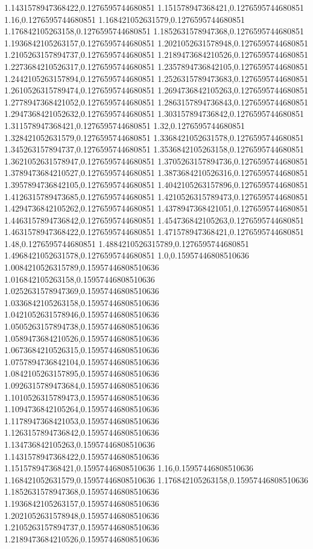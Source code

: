 1.1431578947368422,0.1276595744680851
1.151578947368421,0.1276595744680851
1.16,0.1276595744680851
1.168421052631579,0.1276595744680851
1.176842105263158,0.1276595744680851
1.1852631578947368,0.1276595744680851
1.1936842105263157,0.1276595744680851
1.2021052631578948,0.1276595744680851
1.2105263157894737,0.1276595744680851
1.2189473684210526,0.1276595744680851
1.2273684210526317,0.1276595744680851
1.2357894736842105,0.1276595744680851
1.2442105263157894,0.1276595744680851
1.2526315789473683,0.1276595744680851
1.2610526315789474,0.1276595744680851
1.2694736842105263,0.1276595744680851
1.2778947368421052,0.1276595744680851
1.2863157894736843,0.1276595744680851
1.2947368421052632,0.1276595744680851
1.303157894736842,0.1276595744680851
1.311578947368421,0.1276595744680851
1.32,0.1276595744680851
1.328421052631579,0.1276595744680851
1.3368421052631578,0.1276595744680851
1.345263157894737,0.1276595744680851
1.3536842105263158,0.1276595744680851
1.3621052631578947,0.1276595744680851
1.3705263157894736,0.1276595744680851
1.3789473684210527,0.1276595744680851
1.3873684210526316,0.1276595744680851
1.3957894736842105,0.1276595744680851
1.4042105263157896,0.1276595744680851
1.4126315789473685,0.1276595744680851
1.4210526315789473,0.1276595744680851
1.4294736842105262,0.1276595744680851
1.4378947368421051,0.1276595744680851
1.4463157894736842,0.1276595744680851
1.454736842105263,0.1276595744680851
1.4631578947368422,0.1276595744680851
1.471578947368421,0.1276595744680851
1.48,0.1276595744680851
1.4884210526315789,0.1276595744680851
1.4968421052631578,0.1276595744680851
1.0,0.15957446808510636
1.0084210526315789,0.15957446808510636
1.016842105263158,0.15957446808510636
1.0252631578947369,0.15957446808510636
1.0336842105263158,0.15957446808510636
1.0421052631578946,0.15957446808510636
1.0505263157894738,0.15957446808510636
1.0589473684210526,0.15957446808510636
1.0673684210526315,0.15957446808510636
1.0757894736842104,0.15957446808510636
1.0842105263157895,0.15957446808510636
1.0926315789473684,0.15957446808510636
1.1010526315789473,0.15957446808510636
1.1094736842105264,0.15957446808510636
1.1178947368421053,0.15957446808510636
1.1263157894736842,0.15957446808510636
1.134736842105263,0.15957446808510636
1.1431578947368422,0.15957446808510636
1.151578947368421,0.15957446808510636
1.16,0.15957446808510636
1.168421052631579,0.15957446808510636
1.176842105263158,0.15957446808510636
1.1852631578947368,0.15957446808510636
1.1936842105263157,0.15957446808510636
1.2021052631578948,0.15957446808510636
1.2105263157894737,0.15957446808510636
1.2189473684210526,0.15957446808510636
